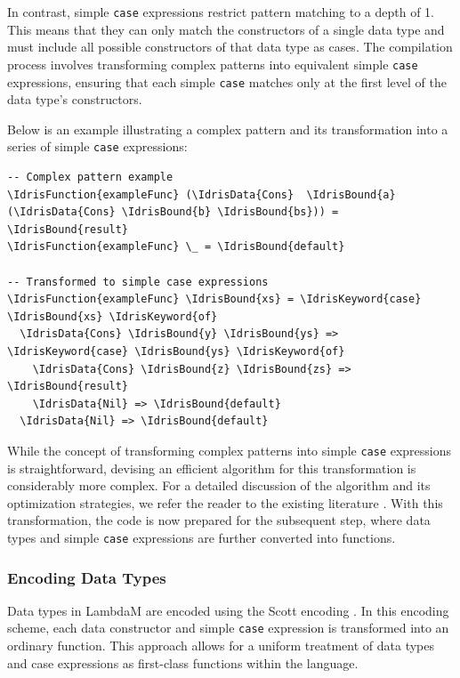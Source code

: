 \documentclass{IEEEtran}
\begin{document}
\par In contrast, simple \texttt{case} expressions restrict pattern matching to a depth of 1. This means that they can only match the constructors of a single data type and must include all possible constructors of that data type as cases. The compilation process involves transforming complex patterns into equivalent simple \texttt{case} expressions, ensuring that each simple \texttt{case} matches only at the first level of the data type's constructors.

\par Below is an example illustrating a complex pattern and its transformation into a series of simple \texttt{case} expressions:

\begin{Verbatim}[commandchars=\\\{\}]
-- Complex pattern example
\IdrisFunction{exampleFunc} (\IdrisData{Cons}  \IdrisBound{a} (\IdrisData{Cons} \IdrisBound{b} \IdrisBound{bs})) = \IdrisBound{result}
\IdrisFunction{exampleFunc} \_ = \IdrisBound{default}

-- Transformed to simple case expressions
\IdrisFunction{exampleFunc} \IdrisBound{xs} = \IdrisKeyword{case} \IdrisBound{xs} \IdrisKeyword{of}
  \IdrisData{Cons} \IdrisBound{y} \IdrisBound{ys} => \IdrisKeyword{case} \IdrisBound{ys} \IdrisKeyword{of}
    \IdrisData{Cons} \IdrisBound{z} \IdrisBound{zs} => \IdrisBound{result}
    \IdrisData{Nil} => \IdrisBound{default}
  \IdrisData{Nil} => \IdrisBound{default}
\end{Verbatim}

\par While the concept of transforming complex patterns into simple \texttt{case} expressions is straightforward, devising an efficient algorithm for this transformation is considerably more complex. For a detailed discussion of the algorithm and its optimization strategies, we refer the reader to the existing literature \cite{Patterns}. With this transformation, the code is now prepared for the subsequent step, where data types and simple \texttt{case} expressions are further converted into functions.

\subsubsection{Encoding Data Types}

\par Data types in LambdaM are encoded using the Scott encoding \cite{Jansen2013}. In this encoding scheme, each data constructor and simple \texttt{case} expression is transformed into an ordinary function. This approach allows for a uniform treatment of data types and case expressions as first-class functions within the language.
\end{document}
